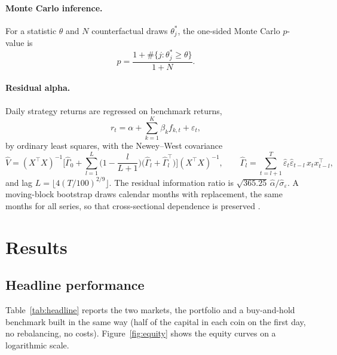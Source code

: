 \documentclass[11pt,a4paper]{article}
\newcommand{\1}{\mathbf{1}}
\begin{document}
\paragraph{Monte Carlo inference.} For a statistic $\theta$ and $N$ counterfactual draws $\theta^*_j$, the one-sided Monte Carlo $p$-value is
\begin{equation}
p=\frac{1+\#\{j:\theta^*_j\ge\theta\}}{1+N}.
\end{equation}

\paragraph{Residual alpha.} Daily strategy returns are regressed on benchmark returns,
\begin{equation}\label{eq:reg}
r_t=\alpha+\sum_{k=1}^{K}\beta_k f_{k,t}+\varepsilon_t,
\end{equation}
by ordinary least squares, with the Newey--West covariance
\begin{equation}
\hat V=(X^\top X)^{-1}\Big[\hat\Gamma_0+\sum_{l=1}^{L}\Big(1-\frac{l}{L+1}\Big)\big(\hat\Gamma_l+\hat\Gamma_l^\top\big)\Big](X^\top X)^{-1},
\qquad \hat\Gamma_l=\sum_{t=l+1}^{T}\hat\varepsilon_t\hat\varepsilon_{t-l}\,x_t x_{t-l}^\top,
\end{equation}
and lag $L=\lfloor4(T/100)^{2/9}\rfloor$. The residual information ratio is $\sqrt{365.25}\,\hat\alpha/\hat\sigma_\varepsilon$. A moving-block bootstrap draws calendar months with replacement, the same months for all series, so that cross-sectional dependence is preserved \citep{Kunsch1989}.

\section{Results}\label{sec:results}

\subsection{Headline performance}

Table~\ref{tab:headline} reports the two markets, the portfolio and a buy-and-hold benchmark built in the same way (half of the capital in each coin on the first day, no rebalancing, no costs). Figure~\ref{fig:equity} shows the equity curves on a logarithmic scale.
\end{document}
